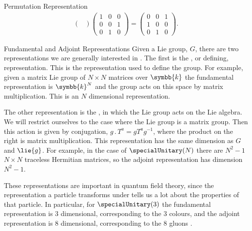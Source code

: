 \documentclass[fleqn]{NotesClass}
\renewcommand{\field}{\symbb{k}}
\newcommand{\action}{\mathbin{.}}
\begin{document}
\begin{exm}{Permutation Representation}{}
\begin{multline}
\begin{pmatrix}
            \end{pmatrix}
            \begin{pmatrix}
                1 & 0 & 0\\
                0 & 0 & 1\\
                0 & 1 & 0
            \end{pmatrix}
            = 
            \begin{pmatrix}
                0 & 0 & 1\\
                1 & 0 & 0\\
                0 & 1 & 0
            \end{pmatrix}
            .
        \end{multline}
    \end{exm}
    
    \begin{exm}{Fundamental and Adjoint Representations}{}
        Given a Lie group, \(G\), there are two representations we are generally interested in \cite[42]{allanach}.
        The first is the , or defining, representation.
        This is the representation used to define the group.
        For example, given a matrix Lie group of \(N \times N\) matrices over \(\field\) the fundamental representation is \(\field^N\) and the group acts on this space by matrix multiplication.
        This is an \(N\) dimensional representation.
        
        The other representation is the , in which the Lie group acts on the Lie algebra.
        We will restrict ourselves to the case where the Lie group is a matrix group.
        Then this action is given by conjugation, \(g \action T^a = gT^a g^{-1}\), where the product on the right is matrix multiplication.
        This representation has the same dimension as \(G\) and \(\lie{g}\).
        For example, in the case of \(\specialUnitary(N)\) there are \(N^2 - 1\) \(N \times N\) traceless Hermitian matrices, so the adjoint representation has dimension \(N^2 - 1\).
        
        These representations are important in quantum field theory, since the representation a particle transforms under tells us a lot about the properties of that particle.
        In particular, for \(\specialUnitary(3)\) the fundamental representation is 3 dimensional, corresponding to the 3 colours, and the adjoint representation is 8 dimensional, corresponding to the 8 gluons \cite[547]{peskin}.
    \end{exm}
    
\end{document}
